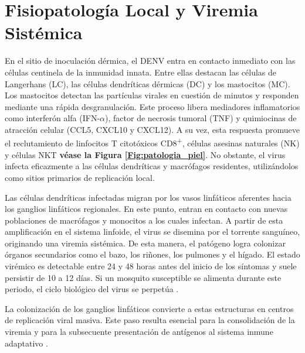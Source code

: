 \section{Fisiopatología Local y Viremia Sistémica}
 En el sitio de inoculación dérmica, el DENV entra en contacto inmediato con las células centinela de la inmunidad innata. Entre ellas destacan las células de Langerhans (LC), las células dendríticas dérmicas (DC) y los mastocitos (MC). Los mastocitos detectan las partículas virales en cuestión de minutos y responden mediante una rápida desgranulación. Este proceso libera mediadores inflamatorios como interferón alfa (IFN-$\alpha$), factor de necrosis tumoral (TNF) y quimiocinas de atracción celular (CCL5, CXCL10 y CXCL12). A su vez, esta respuesta promueve el reclutamiento de linfocitos T citotóxicos CD8\textsuperscript{+}, células asesinas naturales (NK) y células NKT \textbf{véase la Figura \ref{Fig:patologia_piel}}. No obstante, el virus infecta eficazmente a las células dendríticas y macrófagos residentes, utilizándolos como sitios primarios de replicación local. %

Las células dendríticas infectadas migran por los vasos linfáticos aferentes hacia los ganglios linfáticos regionales. En este punto, entran en contacto con nuevas poblaciones de macrófagos y monocitos a los cuales infectan. A partir de esta amplificación en el sistema linfoide, el virus se disemina por el torrente sanguíneo, originando una viremia sistémica. De esta manera, el patógeno logra colonizar órganos secundarios como el bazo, los riñones, los pulmones y el hígado. El estado virémico es detectable entre 24 y 48 horas antes del inicio de los síntomas y suele persistir de 10 a 12 días. Si un mosquito susceptible se alimenta durante este periodo, el ciclo biológico del virus se perpetúa \cite{nanaware2021dengue}.

La colonización de los ganglios linfáticos convierte a estas estructuras en centros de replicación viral masiva. Este paso resulta esencial para la consolidación de la viremia y para la subsecuente presentación de antígenos al sistema inmune adaptativo \cite{st2019adaptive}.

